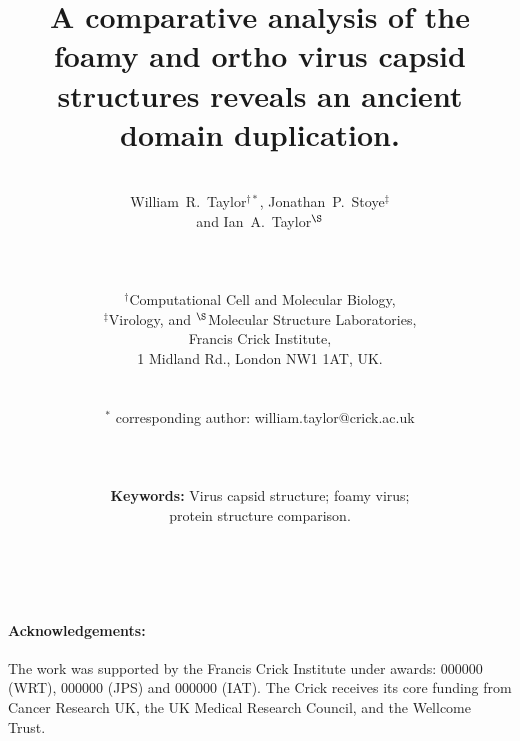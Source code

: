 \documentclass[12pt]{article}
\begin{document}
\title{\bf A comparative analysis of the foamy and ortho virus capsid structures
           reveals an ancient domain duplication.
}

\author{\\William~R.~Taylor$^{\dagger*}$,
Jonathan~P.~Stoye$^{\ddagger}$\\
and
Ian~A.~Taylor$^{\S}$\\ \\ \\ \\
$^\dagger$Computational Cell and Molecular Biology,\\
$^\ddagger$Virology, and
$^\S$Molecular Structure Laboratories,\\
Francis Crick Institute,\\
1 Midland Rd., London NW1 1AT, UK.\\ \\ \\
$^*$ corresponding author: william.taylor@crick.ac.uk\\ \\ \\ \\
{\bf Keywords:} Virus capsid structure; foamy virus;\\ protein structure comparison.\\ \\ \\
}
\begin{singlespace}
\maketitle
\end{singlespace}
\clearpage

\clearpage

\clearpage

\clearpage

\clearpage

\clearpage
\begin{singlespace}


\paragraph{Acknowledgements:}
The work was supported by the Francis Crick Institute under awards: 000000 (WRT), 000000 (JPS) and 000000 (IAT). 
The Crick receives its core funding from Cancer Research UK, the UK Medical Research Council, and the Wellcome Trust.
%
\end{singlespace}
\end{document}
